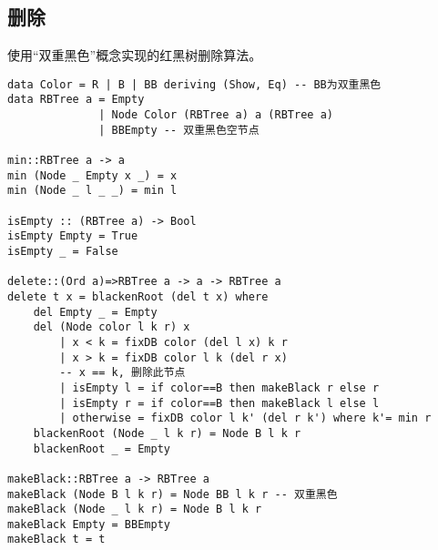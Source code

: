 \documentclass{ctexart}
\begin{document}
\subsection{删除}

使用“双重黑色”概念实现的红黑树删除算法。

\begin{lstlisting}
data Color = R | B | BB deriving (Show, Eq) -- BB为双重黑色
data RBTree a = Empty
              | Node Color (RBTree a) a (RBTree a)
              | BBEmpty -- 双重黑色空节点

min::RBTree a -> a
min (Node _ Empty x _) = x
min (Node _ l _ _) = min l

isEmpty :: (RBTree a) -> Bool
isEmpty Empty = True
isEmpty _ = False

delete::(Ord a)=>RBTree a -> a -> RBTree a
delete t x = blackenRoot (del t x) where
    del Empty _ = Empty
    del (Node color l k r) x
        | x < k = fixDB color (del l x) k r
        | x > k = fixDB color l k (del r x)
        -- x == k, 删除此节点
        | isEmpty l = if color==B then makeBlack r else r
        | isEmpty r = if color==B then makeBlack l else l
        | otherwise = fixDB color l k' (del r k') where k'= min r
    blackenRoot (Node _ l k r) = Node B l k r
    blackenRoot _ = Empty

makeBlack::RBTree a -> RBTree a
makeBlack (Node B l k r) = Node BB l k r -- 双重黑色
makeBlack (Node _ l k r) = Node B l k r
makeBlack Empty = BBEmpty
makeBlack t = t


\end{lstlisting}
\end{document}

